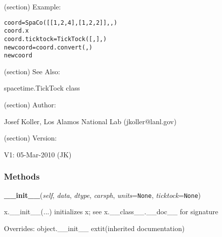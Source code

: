 (section) Example:

\begin{alltt}
\pysrcprompt{{\textgreater}{\textgreater}{\textgreater} }coord = SpaCo([[1,2,4],[1,2,2]], , )
\pysrcprompt{{\textgreater}{\textgreater}{\textgreater} }coord.x  
\pysrcoutput{}\pysrcprompt{{\textgreater}{\textgreater}{\textgreater} }coord.ticktock = TickTock([, ], ) 
\pysrcprompt{{\textgreater}{\textgreater}{\textgreater} }newcoord = coord.convert(, )
\pysrcprompt{{\textgreater}{\textgreater}{\textgreater} }newcoord\end{alltt}
(section) See Also:

  spacetime.TickTock class

(section) Author:

  Josef Koller, Los Alamos National Lab (jkoller@lanl.gov)

(section) Version:

  V1: 05-Mar-2010 (JK)



  \subsubsection{Methods}

    \vspace{0.5ex}

\hspace{.8\funcindent}\begin{boxedminipage}{\funcwidth}

    \raggedright \textbf{\_\_init\_\_}(\textit{self}, \textit{data}, \textit{dtype}, \textit{carsph}, \textit{units}={\tt None}, \textit{ticktock}={\tt None})

\setlength{\parskip}{2ex}
    x.\_\_init\_\_(...) initializes x; see x.\_\_class\_\_.\_\_doc\_\_ for 
    signature

\setlength{\parskip}{1ex}
      Overrides: object.\_\_init\_\_ 	extit{(inherited documentation)}

    \end{boxedminipage}


